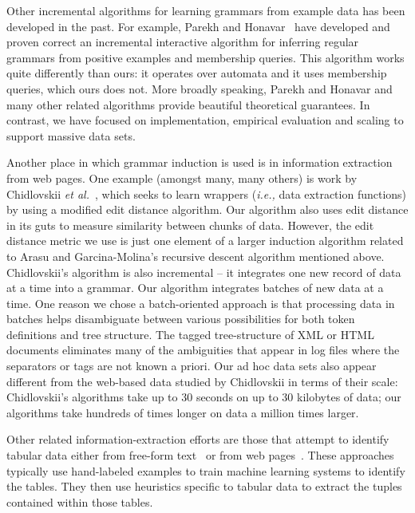 Other incremental algorithms for learning grammars from example data
has been developed in the past.  For example, Parekh and 
Honavar~\cite{parekh+:incremental} have developed and proven correct
an incremental interactive algorithm for inferring
regular grammars from positive examples and membership queries.
This algorithm works quite differently than ours:  it operates over
automata and it uses membership queries, which ours does not.
More broadly speaking, Parekh and Honavar and many other related algorithms
provide beautiful theoretical guarantees.  In contrast, we have
focused on implementation, empirical 
evaluation and scaling to support massive data sets.

Another place in which grammar induction is used is in information
extraction from web pages.  One example (amongst many, many others) is
work by Chidlovskii {\em et al.}~\cite{chidlovskii+:wrapper-generation},
which seeks to learn wrappers ({\em i.e.,} data extraction functions)
by using a modified edit distance algorithm.  Our algorithm also
uses edit distance in its guts to measure similarity
between chunks of data.  However, the edit distance metric we use is just
one element of a larger induction algorithm related to Arasu and
Garcina-Molina's recursive descent algorithm mentioned above.
Chidlovskii's algorithm is also incremental -- it
integrates one new record of data at a time into a grammar.
Our algorithm integrates batches of new data at a time.  One
reason we chose a batch-oriented approach is that processing
data in batches helps
disambiguate between various possibilities for both token
definitions and tree structure.  The tagged tree-structure of
XML or HTML documents eliminates many of the ambiguities that
appear in log files where the separators or tags are not known
a priori.  Our ad hoc data sets also appear different
from the web-based data studied by Chidlovskii in terms of their
scale:  Chidlovskii's algorithms take up to
30 seconds on up to 30 kilobytes of data; our algorithms 
take hundreds of times longer on data a million times larger.

Other related information-extraction efforts
are those that attempt to identify tabular data 
either from free-form text~\cite{Ng+:texttables,Pinto+:texttables} or
from web pages~\cite{Lerman+:webtables}.  These approaches typically
use hand-labeled examples to train machine learning systems to
identify the tables.  They then use heuristics specific to tabular
data to extract the tuples contained within those tables.  

